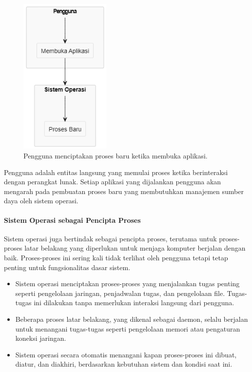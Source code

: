 \documentclass[12pt]{article}
\begin{document}
\begin{figure}[h]
    \centering
    \includegraphics[width=0.4\textwidth]{asset/user process creation.png}
    \caption{Pengguna menciptakan proses baru ketika membuka aplikasi.}
\end{figure}


Pengguna adalah entitas langsung yang memulai proses ketika berinteraksi dengan perangkat lunak. Setiap aplikasi yang dijalankan pengguna akan mengarah pada pembuatan proses baru yang membutuhkan manajemen sumber daya oleh sistem operasi.

\paragraph{Sistem Operasi sebagai Pencipta Proses}

Sistem operasi juga bertindak sebagai pencipta proses, terutama untuk proses-proses latar belakang yang diperlukan untuk menjaga komputer berjalan dengan baik. Proses-proses ini sering kali tidak terlihat oleh pengguna tetapi tetap penting untuk fungsionalitas dasar sistem.

\begin{itemize}
    \item  Sistem operasi menciptakan proses-proses yang menjalankan tugas penting seperti pengelolaan jaringan, penjadwalan tugas, dan pengelolaan file. Tugas-tugas ini dilakukan tanpa memerlukan interaksi langsung dari pengguna.
    \item  Beberapa proses latar belakang, yang dikenal sebagai daemon, selalu berjalan untuk menangani tugas-tugas seperti pengelolaan memori atau pengaturan koneksi jaringan.
    \item  Sistem operasi secara otomatis menangani kapan proses-proses ini dibuat, diatur, dan diakhiri, berdasarkan kebutuhan sistem dan kondisi saat ini.
\end{itemize}
\end{document}
